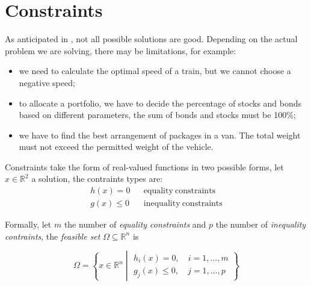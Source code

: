 
\section{Constraints}
\label{sec:op.contraints}

As anticipated in , not all possible solutions are good. Depending on the actual problem we are solving, there may be limitations, for example:
\vspace{-0.8em}
\begin{itemize}
    \setlength\itemsep{.2em}
    \item we need to calculate the optimal speed of a train, but we cannot choose a negative speed;
    \item to allocate a portfolio, we have to decide the percentage of stocks and bonds based on different parameters, the sum of bonds and stocks must be 100\%;
    \item we have to find the best arrangement of packages in a van. The total weight must not exceed the permitted weight of the vehicle.
\end{itemize}

Constraints take the form of real-valued functions in two possible forms, let \( x \in \mathbb{R}^2 \) a solution, the contraints types are:
\begin{align*}
    h(x) = 0 && \mathrm{equality~constraints} \\
    g(x) \leq 0  && \mathrm{inequality~constraints}
\end{align*}

Formally, let \( m \) the number of \textit{equality constraints} and \( p \) the number of \textit{inequality contraints}, the \textit{feasible set} \( \Omega \subseteq \mathbb{R}^n \) is

\[ 
    \Omega = \left\{ 
        x \in \mathbb{R}^n   
        \middle\vert
        \begin{array}{l}
            h_i(x) = 0, \quad i = 1, ..., m \\
            g_j(x) \leq 0, \quad j = 1, ..., p
        \end{array}
    \right\}
\]

